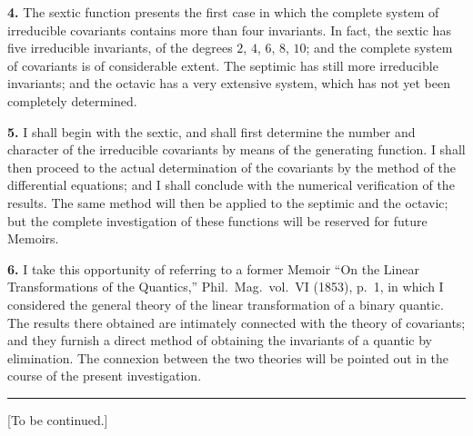 \documentclass[11pt,a4paper]{article}
\begin{document}
\clearpage
\setcounter{page}{312}

\textbf{4.} The sextic function presents the first case in which the complete system of irreducible covariants contains more than four invariants. In fact, the sextic has five irreducible invariants, of the degrees $2$, $4$, $6$, $8$, $10$; and the complete system of covariants is of considerable extent. The septimic has still more irreducible invariants; and the octavic has a very extensive system, which has not yet been completely determined.

\textbf{5.} I shall begin with the sextic, and shall first determine the number and character of the irreducible covariants by means of the generating function. I shall then proceed to the actual determination of the covariants by the method of the differential equations; and I shall conclude with the numerical verification of the results. The same method will then be applied to the septimic and the octavic; but the complete investigation of these functions will be reserved for future Memoirs.

\textbf{6.} I take this opportunity of referring to a former Memoir ``On the Linear Transformations of the Quantics,'' Phil.\ Mag.\ vol.\ VI (1853), p.~1, in which I considered the general theory of the linear transformation of a binary quantic. The results there obtained are intimately connected with the theory of covariants; and they furnish a direct method of obtaining the invariants of a quantic by elimination. The connexion between the two theories will be pointed out in the course of the present investigation.

\vspace{2ex}
\begin{center}
\rule{0.5\textwidth}{0.4pt}
\end{center}

\vspace{2ex}
\begin{center}
[To be continued.]
\end{center}
\end{document}
